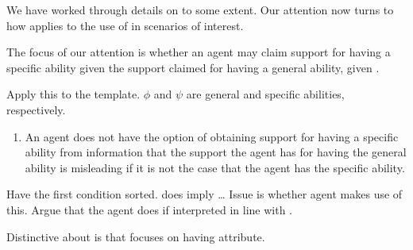 \newpage

\begin{note}
  We have worked through details on \nI{} to some extent.
  Our attention now turns to how \nI{} applies to the use of \aben{} in scenarios of interest.

  The focus of our attention is whether an agent may claim support for having a specific ability given the support claimed for having a general ability, given \gsi{}.

  Apply this to the \nI{} template.
  \(\phi\) and \(\psi\) are general and specific abilities, respectively.

  \begin{enumerate}[label=\nI{}, ref=\nI{}]
  \item An agent does not have the option of obtaining support for having a specific ability from information that the support the agent has for having the general ability is misleading if it is not the case that the agent has the specific ability.
  \end{enumerate}

  Have the first condition sorted.
  \gsi{} does imply \dots
  Issue is whether agent makes use of this.
  Argue that the agent does if interpreted in line with \AR{}.

  Distinctive about \AR{} is that focuses on having attribute.
\end{note}

